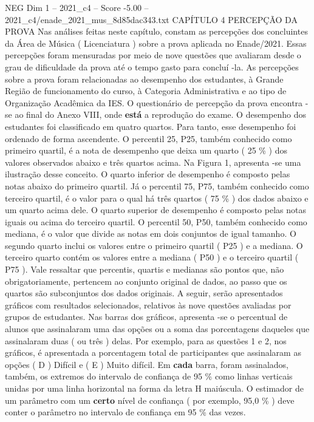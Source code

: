 \begin{textsample}{NEG Dim 1 – 2021\_c4 – Score -5.00 – 2021\_c4/enade\_2021\_mus\_8d85dac343.txt}  \label{ex:f1_neg_062}
CAPÍTULO 4 PERCEPÇÃO DA PROVA Nas análises feitas neste capítulo, constam as percepções dos concluintes da Área de Música ( Licenciatura ) sobre a prova aplicada no Enade/2021.
Essas percepções foram mensuradas por meio de nove questões que avaliaram desde o grau de dificuldade da prova até o tempo gasto para concluí -la.
As percepções sobre a prova foram relacionadas ao desempenho dos estudantes, à Grande Região de funcionamento do curso, à Categoria Administrativa e ao tipo de Organização Acadêmica da IES.
O questionário de percepção da prova encontra -se ao final do Anexo VIII, onde \textbf{está} a reprodução do exame.
O desempenho dos estudantes foi classificado em quatro quartos.
Para tanto, esse desempenho foi ordenado de forma ascendente.
O percentil 25, P25, também conhecido como primeiro quartil, é a nota de desempenho que deixa um quarto ( 25 \% ) dos valores observados abaixo e três quartos acima.
Na Figura 1, apresenta -se uma ilustração desse conceito.
O quarto inferior de desempenho é composto pelas notas abaixo do primeiro quartil.
Já o percentil 75, P75, também conhecido como terceiro quartil, é o valor para o qual há três quartos ( 75 \% ) dos dados abaixo e um quarto acima dele.
O quarto superior de desempenho é composto pelas notas iguais ou acima do terceiro quartil.
O percentil 50, P50, também conhecido como mediana, é o valor que divide as notas em dois conjuntos de igual tamanho.
O segundo quarto inclui os valores entre o primeiro quartil ( P25 ) e a mediana.
O terceiro quarto contém os valores entre a mediana ( P50 ) e o terceiro quartil ( P75 ).
Vale ressaltar que percentis, quartis e medianas são pontos que, não obrigatoriamente, pertencem ao conjunto original de dados, ao passo que os quartos são subconjuntos dos dados originais.
A seguir, serão apresentados gráficos com resultados selecionados, relativos às nove questões avaliadas por grupos de estudantes.
Nas barras dos gráficos, apresenta -se o percentual de alunos que assinalaram uma das opções ou a soma das porcentagens daqueles que assinalaram duas ( ou três ) delas.
Por exemplo, para as questões 1 e 2, nos gráficos, é apresentada a porcentagem total de participantes que assinalaram as opções ( D ) Difícil e ( E ) Muito difícil.
Em \textbf{cada} barra, foram assinalados, também, os extremos do intervalo de confiança de 95 \% como linhas verticais unidas por uma linha horizontal na forma da letra H maiúscula.
O estimador de um parâmetro com um \textbf{certo} nível de confiança ( por exemplo, 95,0 \% ) deve conter o parâmetro no intervalo de confiança em 95 \% das vezes.

\end{textsample}
